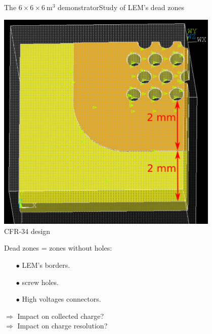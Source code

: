 \documentclass[10pt]{beamer}
\begin{document}
    \begin{frame}{The \texorpdfstring{$6 \times 6 \times \SI{6}{\meter\cubed}$}{666} demonstrator}{Study of LEM's dead zones}
    	\begin{scriptsize}
    		\begin{minipage}{0.38\textwidth}
    			\begin{center}
    				\includegraphics[width=0.8\textwidth]{figures/666/corner_annotations.png}\\
    				CFR-34 design\\
    			\end{center} 
    			Dead zones = zones without holes:
    			\begin{itemize}
    				\item[$\bullet$] LEM's borders.
    				\item[$\bullet$] screw holes.
    				\item[$\bullet$] High voltages connectors.
    			\end{itemize}
    			$\Rightarrow$ Impact on collected charge?\\
    			$\Rightarrow$ Impact on charge resolution?\\
    			

\end{minipage}
\end{scriptsize}
\end{frame}
\end{document}
